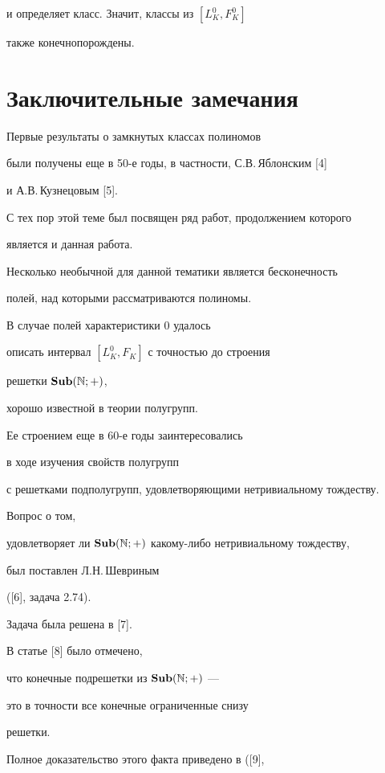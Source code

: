 и определяет класс. Значит, классы из $[L^0_K,F^0_K]$


также конечнопорождены.





\section{Заключительные замечания}





Первые результаты о замкнутых классах полиномов


были получены еще в 50-е годы, в частности, С.В.\,Яблонским [4]


и А.В.\,Кузнецовым [5].


С тех пор этой теме был посвящен ряд работ, продолжением которого


является и данная работа.


Несколько необычной для данной тематики является бесконечность


полей, над которыми рассматриваются полиномы.





В случае полей характеристики $0$ удалось


описать интервал $[L^0_K,F_K]$ с точностью до строения


решетки $\bold{Sub} (\Bbb N;+)$, 


хорошо известной в теории полугрупп.


Ее строением еще в 60-е годы заинтересовались


в ходе изучения свойств полугрупп


с решетками подполугрупп, удовлетворяющими нетривиальному тождеству.


Вопрос о том, 


удовлетворяет ли $\bold{Sub} (\Bbb N;+)$ какому-либо нетривиальному тождеству,


был поставлен Л.Н.\,Шевриным 


([6], задача 2.74).


Задача была решена в [7].


В статье [8] было отмечено, 


что конечные подрешетки из $\bold{Sub} (\Bbb N;+)$ ---


это в точности все конечные ограниченные снизу %


решетки.


Полное доказательство этого факта приведено в ([9],


